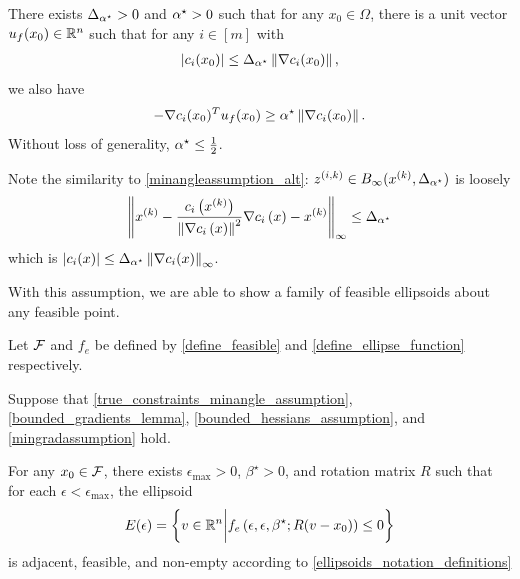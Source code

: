 \begin{assumption}
\label{true_constraints_minangle_assumption}
There exists ${\Delta_{\alpha^{\star}}} > 0$ and ${ \alpha^{\star} } > 0$ such that for any $x_0 \in \Omega$,
there is a unit vector ${u_{f}(x_0)} \in \mathbb R^n$ such that 
for any $i \in [m]$ with
\begin{align*}
\left|c_i(x_0)\right| \le {\Delta_{\alpha^{\star}}} \left\|\nabla c_i(x_0)\right\|,
\end{align*}
we also have
\begin{align*}
-\nabla c_i(x_0)^T {u_{f}(x_0)} \ge { \alpha^{\star} } \left\| \nabla c_i(x_0) \right\|.
\end{align*}
Without loss of generality, ${ \alpha^{\star} } \le \frac 1 2$.
\end{assumption}

Note the similarity to \cref{minangleassumption_alt}:
${z^{(i, k)}} \in B_{\infty}(x^{(k)}, {\Delta_{\alpha^{\star}}})$ is loosely
\begin{align*}
\left\|x^{(k)} - \frac{c_i\left(x^{(k)}\right)}{\left\|\nabla c_i\left(x\right)\right\|^2} \nabla c_i\left(x\right)  - x^{(k)}\right\|_{\infty} \le {\Delta_{\alpha^{\star}}}
\end{align*}
which is
$\left|c_i(x)\right| \le {\Delta_{\alpha^{\star}}} \left\|\nabla c_i(x)\right\|_{\infty}$.

With this assumption, we are able to show a family of feasible ellipsoids about any feasible point.

\begin{theorem}
\label{nonconvex_ellipsoid_existence}
Let ${\mathcal F}$ and $f_e$ be defined by \cref{define_feasible} and \cref{define_ellipse_function} respectively.

Suppose that 
\cref{true_constraints_minangle_assumption},
\cref{bounded_gradients_lemma},
\cref{bounded_hessians_assumption},
and \cref{mingradassumption} hold.

For any $x_0 \in {\mathcal F}$,
there exists $\epsilon_{\textrm{max}} > 0$, $\beta^{\star}>0$, and rotation matrix $R$ such that for each $\epsilon < \epsilon_{\textrm{max}}$, the ellipsoid
\begin{align*}
E(\epsilon) = \left\{v \in \mathbb R^n \bigg| f_e\left(\epsilon, \epsilon, \beta^{\star}; R(v - x_0)\right) \le 0\right\}
\end{align*}
is adjacent, feasible, and non-empty according to \cref{ellipsoids_notation_definitions}
\end{theorem}


